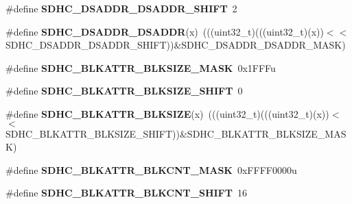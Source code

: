 \begin{DoxyCompactItemize}
\item 
\#define {\bfseries S\+D\+H\+C\+\_\+\+D\+S\+A\+D\+D\+R\+\_\+\+D\+S\+A\+D\+D\+R\+\_\+\+S\+H\+I\+FT}~2\hypertarget{group__SDHC__Register__Masks_gaab7280ffe17d17dc4e36a58270c97edb}{}\label{group__SDHC__Register__Masks_gaab7280ffe17d17dc4e36a58270c97edb}

\item 
\#define {\bfseries S\+D\+H\+C\+\_\+\+D\+S\+A\+D\+D\+R\+\_\+\+D\+S\+A\+D\+DR}(x)~(((uint32\+\_\+t)(((uint32\+\_\+t)(x))$<$$<$S\+D\+H\+C\+\_\+\+D\+S\+A\+D\+D\+R\+\_\+\+D\+S\+A\+D\+D\+R\+\_\+\+S\+H\+I\+FT))\&S\+D\+H\+C\+\_\+\+D\+S\+A\+D\+D\+R\+\_\+\+D\+S\+A\+D\+D\+R\+\_\+\+M\+A\+SK)\hypertarget{group__SDHC__Register__Masks_gaef12dcdcf7b6872221585294357d8bc4}{}\label{group__SDHC__Register__Masks_gaef12dcdcf7b6872221585294357d8bc4}

\item 
\#define {\bfseries S\+D\+H\+C\+\_\+\+B\+L\+K\+A\+T\+T\+R\+\_\+\+B\+L\+K\+S\+I\+Z\+E\+\_\+\+M\+A\+SK}~0x1\+F\+F\+Fu\hypertarget{group__SDHC__Register__Masks_ga15a1d67cd23b4eaae16cf10809520195}{}\label{group__SDHC__Register__Masks_ga15a1d67cd23b4eaae16cf10809520195}

\item 
\#define {\bfseries S\+D\+H\+C\+\_\+\+B\+L\+K\+A\+T\+T\+R\+\_\+\+B\+L\+K\+S\+I\+Z\+E\+\_\+\+S\+H\+I\+FT}~0\hypertarget{group__SDHC__Register__Masks_gab4dbeb59800b35d4f9e1d12f27a3f4d8}{}\label{group__SDHC__Register__Masks_gab4dbeb59800b35d4f9e1d12f27a3f4d8}

\item 
\#define {\bfseries S\+D\+H\+C\+\_\+\+B\+L\+K\+A\+T\+T\+R\+\_\+\+B\+L\+K\+S\+I\+ZE}(x)~(((uint32\+\_\+t)(((uint32\+\_\+t)(x))$<$$<$S\+D\+H\+C\+\_\+\+B\+L\+K\+A\+T\+T\+R\+\_\+\+B\+L\+K\+S\+I\+Z\+E\+\_\+\+S\+H\+I\+FT))\&S\+D\+H\+C\+\_\+\+B\+L\+K\+A\+T\+T\+R\+\_\+\+B\+L\+K\+S\+I\+Z\+E\+\_\+\+M\+A\+SK)\hypertarget{group__SDHC__Register__Masks_ga189a6c8c7269f3fce6679d2dc310c86b}{}\label{group__SDHC__Register__Masks_ga189a6c8c7269f3fce6679d2dc310c86b}

\item 
\#define {\bfseries S\+D\+H\+C\+\_\+\+B\+L\+K\+A\+T\+T\+R\+\_\+\+B\+L\+K\+C\+N\+T\+\_\+\+M\+A\+SK}~0x\+F\+F\+F\+F0000u\hypertarget{group__SDHC__Register__Masks_ga797a081db083b97f61d5f657ae83f752}{}\label{group__SDHC__Register__Masks_ga797a081db083b97f61d5f657ae83f752}

\item 
\#define {\bfseries S\+D\+H\+C\+\_\+\+B\+L\+K\+A\+T\+T\+R\+\_\+\+B\+L\+K\+C\+N\+T\+\_\+\+S\+H\+I\+FT}~16\hypertarget{group__SDHC__Register__Masks_ga1461e7582635ec25e017243f95a9e649}{}\label{group__SDHC__Register__Masks_ga1461e7582635ec25e017243f95a9e649}


\end{DoxyCompactItemize}
